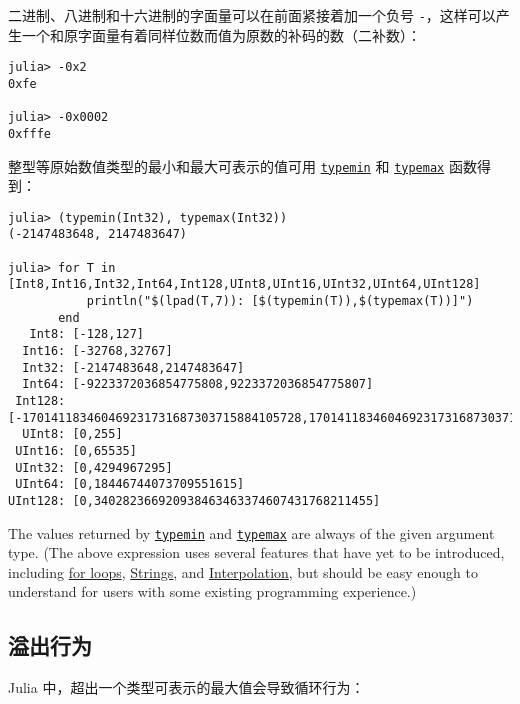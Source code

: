 二进制、八进制和十六进制的字面量可以在前面紧接着加一个负号 \texttt{-}，这样可以产生一个和原字面量有着同样位数而值为原数的补码的数（二补数）：




\begin{verbatim}
julia> -0x2
0xfe

julia> -0x0002
0xfffe
\end{verbatim}



整型等原始数值类型的最小和最大可表示的值可用 \hyperlink{3613894539247233488}{\texttt{typemin}} 和 \hyperlink{17760305803764597758}{\texttt{typemax}} 函数得到：




\begin{verbatim}
julia> (typemin(Int32), typemax(Int32))
(-2147483648, 2147483647)

julia> for T in [Int8,Int16,Int32,Int64,Int128,UInt8,UInt16,UInt32,UInt64,UInt128]
           println("$(lpad(T,7)): [$(typemin(T)),$(typemax(T))]")
       end
   Int8: [-128,127]
  Int16: [-32768,32767]
  Int32: [-2147483648,2147483647]
  Int64: [-9223372036854775808,9223372036854775807]
 Int128: [-170141183460469231731687303715884105728,170141183460469231731687303715884105727]
  UInt8: [0,255]
 UInt16: [0,65535]
 UInt32: [0,4294967295]
 UInt64: [0,18446744073709551615]
UInt128: [0,340282366920938463463374607431768211455]
\end{verbatim}



The values returned by \hyperlink{3613894539247233488}{\texttt{typemin}} and \hyperlink{17760305803764597758}{\texttt{typemax}} are always of the given argument type. (The above expression uses several features that have yet to be introduced, including \hyperlink{9034109510149997190}{for loops}, \hyperlink{205866387929607333}{Strings}, and \hyperlink{4452850363638134205}{Interpolation}, but should be easy enough to understand for users with some existing programming experience.)



\hypertarget{7600249066838051055}{}


\subsection{溢出行为}



Julia 中，超出一个类型可表示的最大值会导致循环行为：




